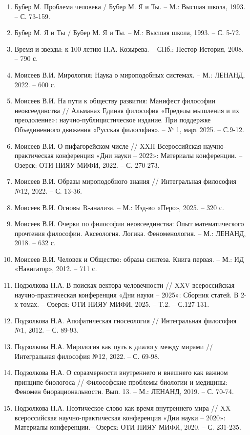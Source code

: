     \begin{enumerate}
        \item Бубер М. Проблема человека / Бубер М. Я и Ты. – М.: Высшая школа, 1993. – С. 73-159.
        \item Бубер М. Я и Ты / Бубер М. Я и Ты. – М.: Высшая школа, 1993. – С. 5-72.
        \item Время и звезды: к 100-летию Н.А. Козырева. – СПб.: Нестор-История, 2008. – 790 с.
        \item Моисеев В.И. Мирология: Наука о мироподобных системах. – М.: ЛЕНАНД, 2022. – 600 с.
        \item Моисеев В.И. На пути к обществу развития: Манифест философии неовсеединства // Альманах Единая философия «Пределы мышления и их преодоление»: научно-публицистическое издание. При поддержке Объединенного движения «Русская философия». – № 1, март 2025. – С.9-12.
        \item Моисеев В.И. О пифагорейском числе // XXII Всероссийская научно-практическая конференция «Дни науки – 2022»: Материалы конференции. – Озерск: ОТИ НИЯУ МИФИ, 2022. – С. 270-273.
        \item Моисеев В.И. Образы мироподобного знания // Интегральная философия №12, 2022. – С. 13-36.
        \item Моисеев В.И. Основы R-анализа. – М.: Изд-во «Перо», 2025. – 320 с.
        \item Моисеев В.И. Очерки по философии неовсеединства: Опыт математического прочтения философии. Аксеология. Логика. Феноменология. – М.: ЛЕНАНД, 2018. – 632 с.
        \item Моисеев В.И. Человек и Общество: образы синтеза. Книга первая. – М.: ИД «Навигатор», 2012. – 711 с.
        \item Подзолкова Н.А. В поисках вектора человечности // XXV всероссийская научно-практическая конференция «Дни науки – 2025»: Сборник статей. В 2-х томах. – Озерск: ОТИ НИЯУ МИФИ, 2025. – Т.2. – С.127-131.
        \item Подзолкова Н.А. Апофатическая гносеология // Интегральная философия №1, 2012. – С. 89-93.
        \item Подзолкова Н.А. Мирология как путь к диалогу между мирами // Интегральная философия №12, 2022. – С. 69-98.
        \item Подзолкова Н.А. О соразмерности внутреннего и внешнего как важном принципе биологоса // Философские проблемы биологии и медицины: Феномен биорациональности. Вып. 13. – М.: ЛЕНАНД, 2019. – С. 70-74.
        \item Подзолкова Н.А. Поэтическое слово как время внутреннего мира // XX всероссийская научно-практическая конференция «Дни науки – 2020»: Материалы конференции.– Озерск: ОТИ НИЯУ МИФИ, 2020. – С. 231-235.

\end{enumerate}
